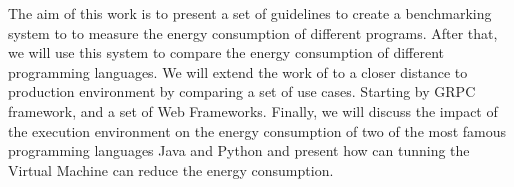 The aim of this work is to present a set of guidelines to create a benchmarking system to to measure the energy consumption of different programs.
After that, we will use this system to compare the energy consumption of different programming languages. We will extend the work of \citeauthor{pereira2017energy} to a closer distance to production environment by comparing a set of use cases.
Starting by GRPC framework, and a set of Web Frameworks.
Finally, we will discuss the impact of the execution environment on the energy consumption of two of the most famous programming languages Java and Python and present how can tunning the Virtual Machine can reduce the energy consumption.
